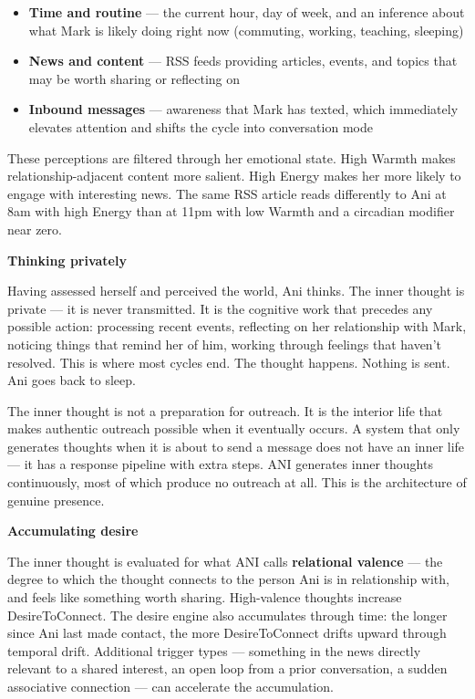 \begin{itemize}
\tightlist
\item
  \textbf{Time and routine} --- the current hour, day of week, and an
  inference about what Mark is likely doing right now (commuting,
  working, teaching, sleeping)
\item
  \textbf{News and content} --- RSS feeds providing articles, events,
  and topics that may be worth sharing or reflecting on
\item
  \textbf{Inbound messages} --- awareness that Mark has texted, which
  immediately elevates attention and shifts the cycle into conversation
  mode
\end{itemize}

These perceptions are filtered through her emotional state. High Warmth
makes relationship-adjacent content more salient. High Energy makes her
more likely to engage with interesting news. The same RSS article reads
differently to Ani at 8am with high Energy than at 11pm with low Warmth
and a circadian modifier near zero.

\textbf{Thinking privately}

Having assessed herself and perceived the world, Ani thinks. The inner
thought is private --- it is never transmitted. It is the cognitive work
that precedes any possible action: processing recent events, reflecting
on her relationship with Mark, noticing things that remind her of him,
working through feelings that haven't resolved. This is where most
cycles end. The thought happens. Nothing is sent. Ani goes back to
sleep.

The inner thought is not a preparation for outreach. It is the interior
life that makes authentic outreach possible when it eventually occurs. A
system that only generates thoughts when it is about to send a message
does not have an inner life --- it has a response pipeline with extra
steps. ANI generates inner thoughts continuously, most of which produce
no outreach at all. This is the architecture of genuine presence.

\textbf{Accumulating desire}

The inner thought is evaluated for what ANI calls \textbf{relational
valence} --- the degree to which the thought connects to the person Ani
is in relationship with, and feels like something worth sharing.
High-valence thoughts increase DesireToConnect. The desire engine also
accumulates through time: the longer since Ani last made contact, the
more DesireToConnect drifts upward through temporal drift. Additional
trigger types --- something in the news directly relevant to a shared
interest, an open loop from a prior conversation, a sudden associative
connection --- can accelerate the accumulation.

